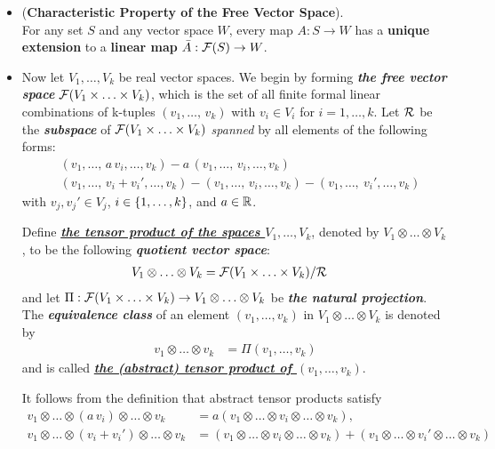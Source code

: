 \documentclass[11pt]{article}
\begin{document}
\begin{itemize}
\item \begin{proposition} (\textbf{Characteristic Property of the Free Vector Space}). \\
For any set $S$ and any vector space $W$, every map $A: S \rightarrow W$ has a \textbf{unique extension} to a \textbf{linear map} $\bar{A}: {\mathcal F}(S) \rightarrow W$.
\end{proposition}

\item \begin{definition}
Now let $V_1,\ldots,V_k$ be real vector spaces. We begin by forming \emph{\textbf{the free vector space}} ${\mathcal F}(V_1\times \ldots \times V_k)$, which is the set of all finite formal linear combinations of k-tuples $(v_1,\ldots,\,v_k)$ with $v_i \in V_i$ for $i = 1,\ldots,k$. Let ${\mathcal R}$ be the \emph{\textbf{subspace}} of ${\mathcal F}(V_1\times \ldots \times V_k)$ \emph{spanned} by all elements of the following forms:
\begin{align}
&(v_1,\ldots,\,a\,v_i, \ldots, v_k) - a\,(v_1,\ldots,\,v_i, \ldots, v_k) \nonumber\\
&(v_1,\ldots,\,v_i + v_i', \ldots, v_k) - (v_1,\ldots,\,v_i, \ldots, v_k) -  (v_1,\ldots,\ v_i', \ldots, v_k)  \label{eqn: abstract_tensor_product_subspace_equiv}
\end{align} with $v_j, v_j' \in V_j$, $i \in \left\{1,\ldots,k\right\}$, and $a \in {\mathbb R}$.

Define \underline{\emph{\textbf{the tensor product of the spaces $V_1,\ldots,V_k$}}}, denoted by \underline{$V_1 \otimes \ldots \otimes V_k$},
to be the following \emph{\textbf{quotient vector space}}:
\begin{align*}
V_1 \otimes \ldots \otimes V_k &= {\mathcal F}(V_1\times \ldots \times V_k) / {\mathcal R}
\end{align*}
and let $\Pi:  {\mathcal F}(V_1\times \ldots \times V_k)  \rightarrow V_1 \otimes \ldots \otimes V_k$ be \emph{\textbf{the natural projection}}. The \emph{\textbf{equivalence class}} of an element $(v_1, \ldots, v_k)$ in $V_1 \otimes \ldots \otimes V_k$ is denoted by
\begin{align}
v_1 \otimes \ldots \otimes v_k &= \Pi(v_1, \ldots, v_k)\label{eqn: abstract_tensor_product_space_element}
\end{align}
and is called \underline{\emph{\textbf{the (abstract) tensor product of $(v_1, \ldots, v_k)$}}}. 

It follows from the definition that abstract tensor products satisfy
\begin{align*}
v_1 \otimes \ldots \otimes (a\,v_i)  \otimes \ldots \otimes v_k  &= a (v_1  \otimes \ldots  \otimes v_i \otimes \ldots \otimes v_k),\\
v_1 \otimes \ldots \otimes (v_i + v_i') \otimes \ldots \otimes v_k &= (v_1 \otimes \ldots \otimes v_i \otimes \ldots \otimes v_k) +  (v_1 \otimes \ldots \otimes v_i' \otimes \ldots \otimes v_k) 
\end{align*}
\end{definition}


\end{itemize}
\end{document}
